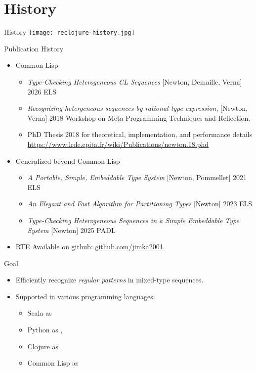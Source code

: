 \section{History}
{  %
\begin{frame}{History}
  \centering
  \texttt{[image: reclojure-history.jpg]}
\end{frame}
}
\begin{frame}{Publication History}
  \begin{itemize}
  \item Common Lisp
    
    \begin{itemize}
    \item \textit{Type-Checking Heterogeneous CL Sequences} [Newton, Demaille, Verna] 2026 ELS
    \item \textit{Recognizing hetergeneous sequences by rational type
      expression}, [Newton, Verna] 2018 Workshop on Meta-Programming
      Techniques and Reflection.
    \item PhD Thesis 2018 for theoretical, implementation, and performance details
      \url{https://www.lrde.epita.fr/wiki/Publications/newton.18.phd}
      
    \end{itemize}
  \item Generalized beyond Common Lisp
    \begin{itemize}
    \item \textit{A Portable, Simple, Embeddable Type System} [Newton, Pommellet] 2021 ELS
      
    \item \textit{An Elegant and Fast Algorithm for Partitioning Types} [Newton] 2023 ELS
    \item \textit{Type-Checking Heterogeneous Sequences in a Simple Embeddable Type System} [Newton] 2025 PADL
    \end{itemize}
  \item   RTE Available on github: \url{github.com/jimka2001}.
  \end{itemize}
\end{frame}


\begin{frame}{Goal}
  \begin{itemize}
  \item Efficiently recognize \emph{regular patterns} in mixed-type sequences.
  \item Supported in various programming languages:
    \begin{itemize}
    \item Scala as 
    \item Python as , 
    \item Clojure as 
    \item Common Lisp as 
    \end{itemize}

  \end{itemize}
\end{frame}
